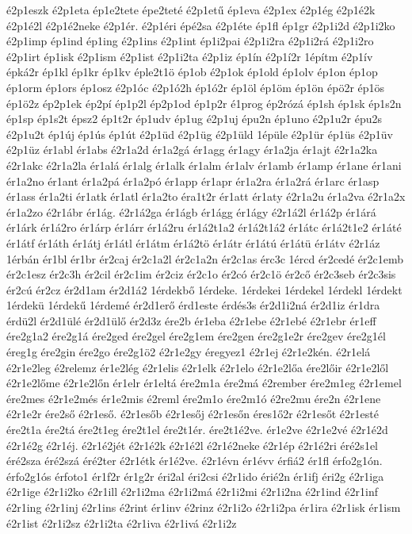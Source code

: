 {é2p1eszk
é2p1eta
ép1e2tete
épe2teté
é2p1etű
ép1eva
é2p1ex
é2p1ég
é2p1é2k
é2p1é2l
é2p1é2neke
é2p1ér.
é2p1éri
épé2sa
é2p1éte
ép1fl
ép1gr
é2p1i2d
é2p1i2ko
é2p1imp
ép1ind
ép1ing
é2p1ins
é2p1int
ép1i2pai
é2p1i2ra
é2p1i2rá
é2p1i2ro
é2p1irt
ép1isk
é2p1ism
é2p1ist
é2p1i2ta
é2p1iz
ép1ín
é2p1í2r
1építm
é2p1ív
épká2r
ép1kl
ép1kr
ép1kv
éple2t1ö
ép1ob
é2p1ok
ép1old
ép1olv
ép1on
ép1op
ép1orm
ép1ors
ép1osz
é2p1óc
é2p1ó2h
ép1ó2r
ép1öl
ép1öm
ép1ön
épö2r
ép1ös
ép1ö2z
ép2p1ek
ép2pí
ép1p2l
ép2p1od
ép1p2r
é1prog
ép2rózá
ép1sh
ép1sk
ép1s2n
ép1sp
ép1s2t
épsz2
ép1t2r
ép1udv
ép1ug
é2p1uj
épu2n
ép1uno
é2p1u2r
épu2s
é2p1u2t
ép1új
ép1ús
ép1út
é2p1üd
é2p1üg
é2p1üld
1épüle
é2p1ür
ép1üs
é2p1üv
é2p1üz
ér1abl
ér1abs
é2r1a2d
ér1a2gá
ér1agg
ér1agy
ér1a2ja
ér1ajt
é2r1a2ka
é2r1akc
é2r1a2la
ér1alá
ér1alg
ér1alk
ér1alm
ér1alv
ér1amb
ér1amp
ér1ane
ér1ani
ér1a2no
ér1ant
ér1a2pá
ér1a2pó
ér1app
ér1apr
ér1a2ra
ér1a2rá
ér1arc
ér1asp
ér1ass
ér1a2ti
ér1atk
ér1atl
ér1a2to
éra1t2r
ér1att
ér1aty
é2r1a2u
ér1a2va
é2r1a2x
ér1a2zo
é2r1ábr
ér1ág.
é2r1á2ga
ér1ágb
ér1ágg
ér1ágy
é2r1á2l
ér1á2p
ér1árá
ér1árk
ér1á2ro
ér1árp
ér1árr
ér1á2ru
ér1á2t1a2
ér1á2t1á2
ér1átc
ér1á2t1e2
ér1áté
ér1átf
ér1áth
ér1átj
ér1átl
ér1átm
ér1á2tö
ér1átr
ér1átú
ér1átü
ér1átv
é2r1áz
1érbán
ér1bl
ér1br
ér2caj
ér2c1a2l
ér2c1a2n
ér2c1as
érc3c
1ércd
ér2cedé
ér2c1emb
ér2c1esz
ér2c3h
ér2cil
ér2c1im
ér2ciz
ér2c1o
ér2có
ér2c1ö
ér2cő
ér2c3seb
ér2c3sis
ér2cú
ér2cz
ér2d1am
ér2d1á2
1érdekbő
1érdeke.
1érdekei
1érdekel
1érdekl
1érdekt
1érdekü
1érdekű
1érdemé
ér2d1erő
érd1este
érdés3s
ér2d1i2ná
ér2d1iz
ér1dra
érdü2l
ér2d1ülé
ér2d1ülő
ér2d3z
ére2b
ér1eba
é2r1ebe
é2r1ebé
é2r1ebr
ér1eff
ére2g1a2
ére2g1á
ére2ged
ére2gel
ére2g1em
ére2gen
ére2g1e2r
ére2gev
ére2g1él
éreg1g
ére2gin
ére2go
ére2g1ö2
é2r1e2gy
éregyez1
é2r1ej
é2r1e2kén.
é2r1elá
é2r1e2leg
é2relemz
ér1e2lég
é2r1elis
é2r1elk
é2r1elo
é2r1e2lőa
ére2lőir
é2r1e2lől
é2r1e2lőme
é2r1e2lőn
ér1elr
ér1eltá
ére2m1a
ére2má
é2rember
ére2m1eg
é2r1emel
ére2mes
é2r1e2més
ér1e2mis
é2reml
ére2m1o
ére2m1ó
é2re2mu
ére2n
é2r1ene
é2r1e2r
ére2ső
é2r1eső.
é2r1esőb
é2r1esőj
é2r1esőn
éres1ő2r
é2r1esőt
é2r1esté
ére2t1a
ére2tá
ére2t1eg
ére2t1el
ére2t1ér.
ére2t1é2ve.
ér1e2ve
é2r1e2vé
é2r1é2d
é2r1é2g
é2r1éj.
é2r1é2jét
é2r1é2k
é2r1é2l
é2r1é2neke
é2r1ép
é2r1é2ri
éré2s1el
éré2sza
éré2szá
éré2ter
é2r1étk
ér1é2ve.
é2r1évn
ér1évv
érfiá2
ér1fl
érfo2g1ón.
érfo2g1ós
érfoto1
ér1f2r
ér1g2r
éri2al
éri2csi
é2r1ido
érié2n
ér1ifj
éri2g
é2r1iga
é2r1ige
é2r1i2ko
é2r1ill
é2r1i2ma
é2r1i2má
é2r1i2mi
é2r1i2na
é2r1ind
é2r1inf
é2r1ing
é2r1inj
é2r1ins
é2rint
ér1inv
é2rinz
é2r1i2o
é2r1i2pa
ér1ira
é2r1isk
ér1ism
é2r1ist
é2r1i2sz
é2r1i2ta
é2r1iva
é2r1ivá
é2r1i2z
}
